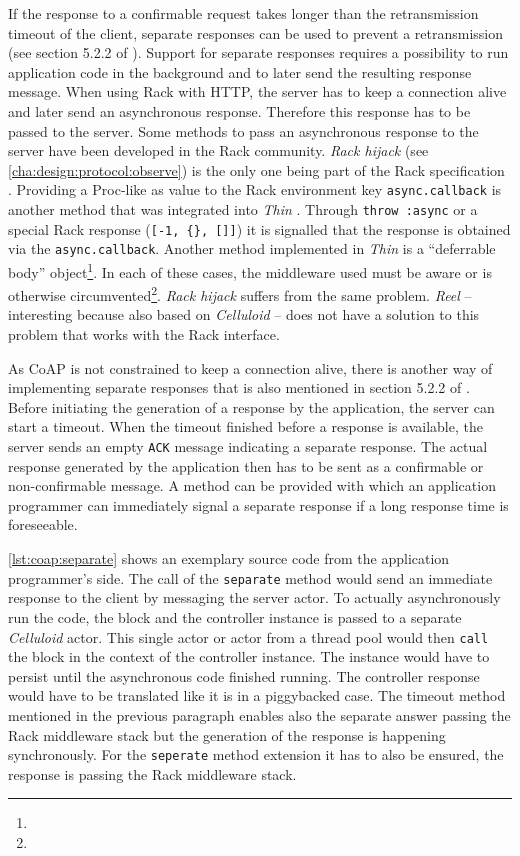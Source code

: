 			If the response to a confirmable request takes longer than the
			retransmission timeout of the client, separate responses can be
			used to prevent a retransmission (see section 5.2.2 of
			\cite{coap}). Support for separate responses requires a possibility
			to run application code in the background and to later send the
			resulting response message. When using Rack with \ac{HTTP}, the
			server has to keep a connection alive and later send an
			asynchronous response. Therefore this response has to be passed to
			the server. Some methods to pass an asynchronous response to the
			server have been developed in the Rack community. \emph{Rack
			hijack} (see \autoref{cha:design:protocol:observe}) is the only one
			being part of the Rack specification \cite{rack}. Providing a
			Proc-like as value to the Rack environment key
			\texttt{async.callback} is another method that was integrated into
			\emph{Thin} \cite{thin}. Through \texttt{throw :async} or a
			special Rack response (\texttt{[-1, \{\}, []]}) it is signalled
			that the response is obtained via the \texttt{async.callback}.
			Another method implemented in \emph{Thin} is a \enquote{deferrable
			body} object\footnote{\urlThinDeferrableBody}. In each of these
			cases, the middleware used must be aware or is otherwise
			circumvented\footnote{\urlRackAsync}. \emph{Rack hijack} suffers
			from the same problem. \emph{Reel} -- interesting because also
			based on \emph{Celluloid} -- does not have a solution to this
			problem that works with the Rack interface.
			
			As \ac{CoAP} is not constrained to keep a connection alive, there
			is another way of implementing separate responses that is also
			mentioned in section 5.2.2 of \cite{coap}. Before initiating the
			generation of a response by the application, the server can start a
			timeout. When the timeout finished before a response is available,
			the server sends an empty \texttt{ACK} message indicating a
			separate response. The actual response generated by the application
			then has to be sent as a confirmable or non-confirmable message. A
			method can be provided with which an application programmer can
			immediately signal a separate response if a long response time is
			foreseeable.

			\autoref{lst:coap:separate} shows an exemplary source code from the
			application programmer's side. The call of the \texttt{separate}
			method would send an immediate response to the client by messaging
			the server actor. To actually asynchronously run the code, the
			block and the controller instance is passed to a separate
			\emph{Celluloid} actor. This single actor or actor from a thread
			pool would then \texttt{call} the block in the context of the
			controller instance. The instance would have to persist until the
			asynchronous code finished running. The controller response would
			have to be translated like it is in a piggybacked case. The timeout
			method mentioned in the previous paragraph enables also the
			separate answer passing the Rack middleware stack but the
			generation of the response is happening synchronously. For the
			\texttt{seperate} method extension it has to also be ensured, the
			response is passing the Rack middleware stack.

